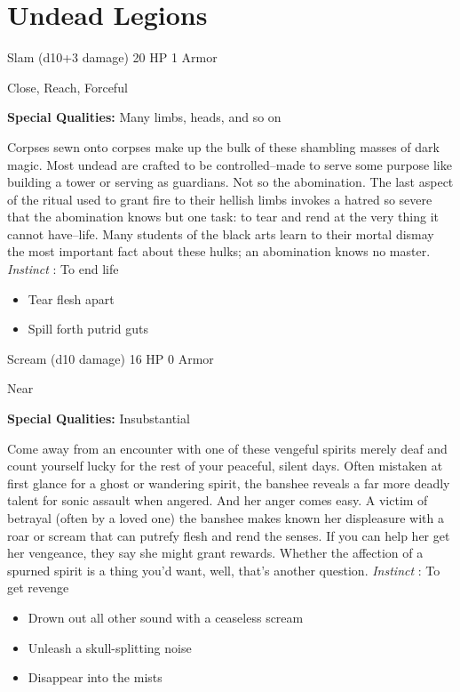 \section{Undead Legions}




 Slam (d10+3 damage) 20 HP 1 Armor


 Close, Reach, Forceful


 \textbf{Special Qualities:}
 Many limbs, heads, and so on


 Corpses sewn onto corpses make up the bulk of these shambling masses of dark magic. Most undead are crafted to be controlled--made to serve some purpose like building a tower or serving as guardians. Not so the abomination. The last aspect of the ritual used to grant fire to their hellish limbs invokes a hatred so severe that the abomination knows but one task: to tear and rend at the very thing it cannot have--life. Many students of the black arts learn to their mortal dismay the most important fact about these hulks; an abomination knows no master. \emph{Instinct}
: To end life
\begin{itemize}
\item Tear flesh apart
\item Spill forth putrid guts

\end{itemize}




 Scream (d10 damage) 16 HP 0 Armor


 Near


 \textbf{Special Qualities:}
 Insubstantial


 Come away from an encounter with one of these vengeful spirits merely deaf and count yourself lucky for the rest of your peaceful, silent days. Often mistaken at first glance for a ghost or wandering spirit, the banshee reveals a far more deadly talent for sonic assault when angered. And her anger comes easy. A victim of betrayal (often by a loved one) the banshee makes known her displeasure with a roar or scream that can putrefy flesh and rend the senses. If you can help her get her vengeance, they say she might grant rewards. Whether the affection of a spurned spirit is a thing you'd want, well, that's another question. \emph{Instinct}
: To get revenge 
\begin{itemize}
\item Drown out all other sound with a ceaseless scream
\item Unleash a skull-splitting noise
\item Disappear into the mists

\end{itemize}


